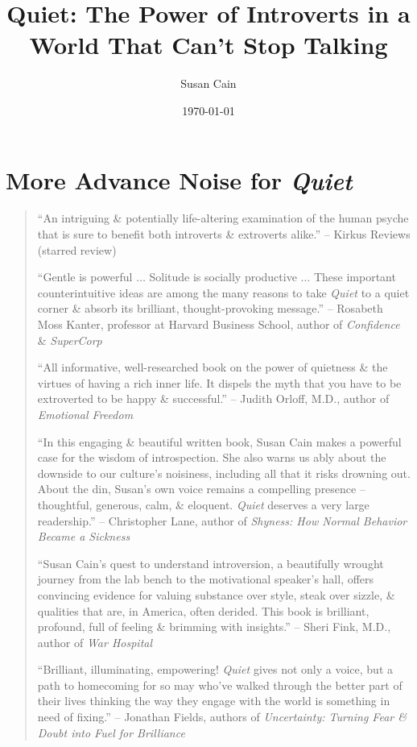 \documentclass{article}
\title{Quiet: The Power of Introverts in a World That Can't Stop Talking}
\author{Susan Cain}
\date{\today}
\numberwithin{equation}{section}
\begin{document}
\maketitle
\tableofcontents


\section*{More Advance Noise for \textit{Quiet}}

\begin{quotation}
	``An intriguing \& potentially life-altering examination of the human psyche that is sure to benefit both introverts \& extroverts alike.'' -- Kirkus Reviews (starred review)
	
	``Gentle is powerful $\ldots$ Solitude is socially productive $\ldots$ These important counterintuitive ideas are among the many reasons to take \textit{Quiet} to a quiet corner \& absorb its brilliant, thought-provoking message.'' -- Rosabeth Moss Kanter, professor at Harvard Business School, author of \textit{Confidence} \& \textit{SuperCorp}
	
	``All informative, well-researched book on the power of quietness \& the virtues of having a rich inner life. It dispels the myth that you have to be extroverted to be happy \& successful.'' -- Judith Orloff, M.D., author of \textit{Emotional Freedom}
	
	``In this engaging \& beautiful written book, Susan Cain makes a powerful case for the wisdom of introspection. She also warns us ably about the downside to our culture's noisiness, including all that it risks drowning out. About the din, Susan's own voice remains a compelling presence -- thoughtful, generous, calm, \& eloquent. \textit{Quiet} deserves a very large readership.'' -- Christopher Lane, author of \textit{Shyness: How Normal Behavior Became a Sickness}
	
	``Susan Cain's quest to understand introversion, a beautifully wrought journey from the lab bench to the motivational speaker's hall, offers convincing evidence for valuing substance over style, steak over sizzle, \& qualities that are, in America, often derided. This book is brilliant, profound, full of feeling \& brimming with insights.'' -- Sheri Fink, M.D., author of \textit{War Hospital}
	
	``Brilliant, illuminating, empowering! \textit{Quiet} gives not only a voice, but a path to homecoming for so may who've walked through the better part of their lives thinking the way they engage with the world is something in need of fixing.'' -- Jonathan Fields, authors of \textit{Uncertainty: Turning Fear \& Doubt into Fuel for Brilliance}
	

\end{quotation}
\end{document}
